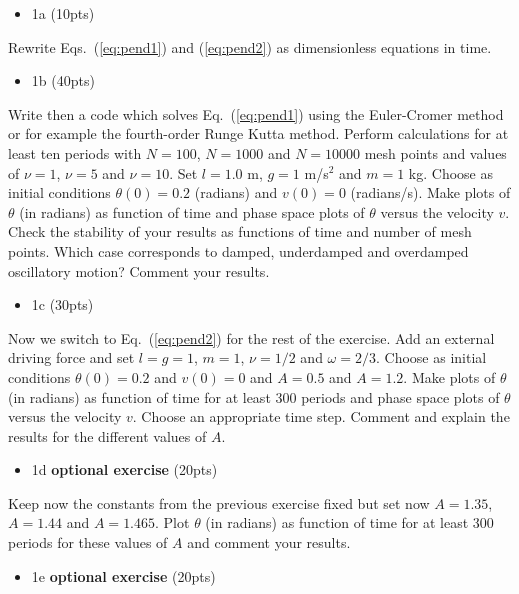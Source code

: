 \documentclass[%
oneside,                 %
final,                   %
10pt]{article}
\begin{document}
\begin{itemize}
\item 1a (10pts)
\end{itemize}

\noindent
Rewrite Eqs.~(\ref{eq:pend1}) and (\ref{eq:pend2}) as dimensionless
equations in time. 

\begin{itemize}
\item 1b (40pts)
\end{itemize}

\noindent
Write then a code which solves Eq.~(\ref{eq:pend1}) using the
Euler-Cromer method or for example the fourth-order Runge Kutta method. Perform
calculations for at least ten periods with $N=100$, $N=1000$ and
$N=10000$ mesh points and values of $\nu = 1$, $\nu = 5$ and $\nu
=10$.  Set $l=1.0$ m, $g=1$ m/s$^2$ and $m=1$ kg.  Choose as initial
conditions $\theta(0) = 0.2$ (radians) and $v(0) = 0$ (radians/s).
Make plots of $\theta$ (in radians) as function of time and phase
space plots of $\theta$ versus the velocity $v$.  Check the stability
of your results as functions of time and number of mesh points.  Which
case corresponds to damped, underdamped and overdamped oscillatory
motion?  Comment your results.

\begin{itemize}
\item 1c (30pts) 
\end{itemize}

\noindent
Now we switch to Eq.~(\ref{eq:pend2}) for the rest of the exercise. Add
an external driving force and set $l=g=1$, $m=1$, $\nu = 1/2$ and
$\omega = 2/3$.  Choose as initial conditions $\theta(0) = 0.2$ and
$v(0) = 0$ and $A=0.5$ and $A=1.2$.  Make plots of $\theta$ (in
radians) as function of time for at least 300 periods and phase space
plots of $\theta$ versus the velocity $v$. Choose an appropriate time
step. Comment and explain the results for the different values of $A$.

\begin{itemize}
\item 1d \textbf{optional exercise} (20pts) 
\end{itemize}

\noindent
Keep now the constants from the previous exercise fixed but
set now $A=1.35$, $A=1.44$ and $A=1.465$. Plot $\theta$ (in radians)
as function of time for at least 300 periods for these values of $A$
and comment your results.

\begin{itemize}
\item 1e \textbf{optional exercise} (20pts)
\end{itemize}
\end{document}
